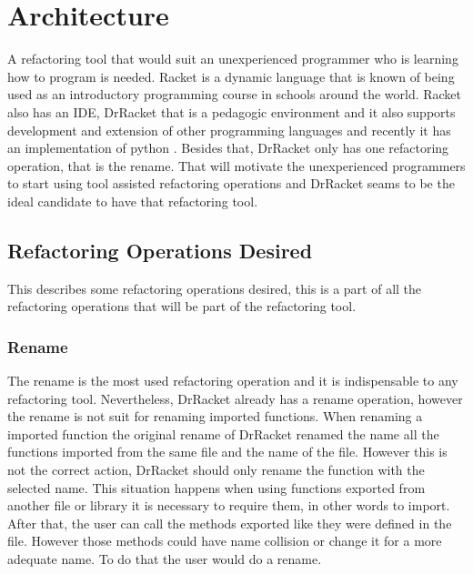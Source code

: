 
% 
% 

\section{Architecture}


A refactoring tool that would suit an unexperienced programmer who is learning how to program is needed. 
Racket is a dynamic language that is known of being used as an introductory programming course in schools around the world. 
Racket also has an IDE, DrRacket that is a pedagogic environment \cite{drscheme_pegadogy} and it also supports development and extension of other programming languages \cite{tobin2011languages} and recently it has an implementation of python \cite{ramos2014implementation}.
Besides that, DrRacket only has one refactoring operation, that is the rename.
That will motivate the unexperienced programmers to start using tool assisted refactoring operations and DrRacket seams to be the ideal candidate to have that refactoring tool.


\subsection{Refactoring Operations Desired}
This describes some refactoring operations desired, this is a part of all the refactoring operations that will be part of the refactoring tool.

\subsubsection{Rename}
The rename is the most used refactoring operation and it is indispensable to any refactoring tool.
Nevertheless, DrRacket already has a rename operation, however the rename is not suit for renaming imported functions.
When renaming a imported function the original rename of DrRacket renamed the name all the functions imported from the same file and the name of the file. However this is not the correct action, DrRacket should only rename the function with the selected name.
This situation happens when using functions exported from another file or library it is necessary to require them, in other words to import.
After that, the user can call the methods exported like they were defined in the file.
However those methods could have name collision or change it for a more adequate name. To do that the user would do a rename.


